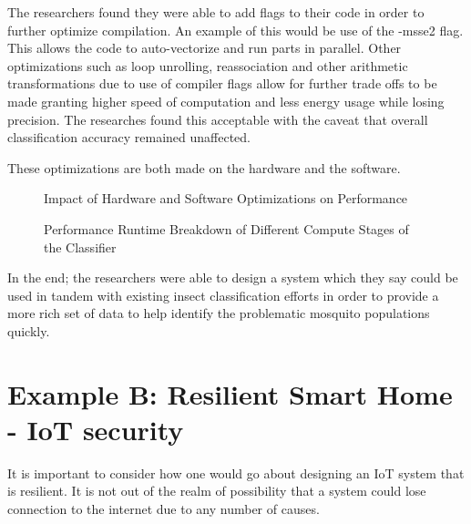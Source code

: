 \documentclass{sig-alternate}
\begin{document}
The researchers found they were able to add flags to their code in order to further optimize compilation. An example of this would be use of the -msse2 flag. This allows the code to auto-vectorize and run parts in parallel. %
Other optimizations such as loop unrolling, reassociation and other arithmetic transformations due to use of compiler flags allow for further trade offs to be made granting higher speed of computation and less energy usage while losing precision. The researches found this acceptable with the caveat that overall classification accuracy remained unaffected.

These optimizations are both made on the hardware and the software.


\begin{figure}
\centering
{}
\caption{Impact of Hardware and Software Optimizations on Performance}
\label{fig:singleColumnFigure2}
\end{figure}


\begin{figure}
\centering
{}
\caption{Performance Runtime Breakdown of Different Compute Stages of the Classifier}
\label{fig:singleColumnFigure2}
\end{figure}

In the end; the researchers were able to design a system which they say could be used in tandem with existing insect classification efforts in order to provide a more rich set of data to help identify the problematic mosquito populations quickly.

\section{Example B: Resilient Smart Home - IoT security}
\label{sec:home}


It is important to consider how one would go about designing an IoT system that is resilient. It is not out of the realm of possibility that a system could lose connection to the internet due to any number of causes.
\end{document}
